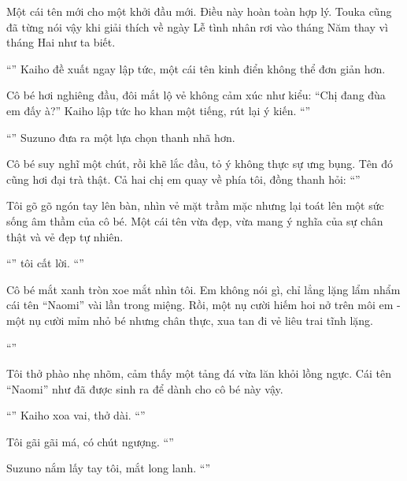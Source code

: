 \documentclass[../main.tex]{subfiles}
\begin{document}
Một cái tên mới cho một khởi đầu mới. Điều này hoàn toàn hợp lý. Touka cũng đã từng nói vậy khi giải thích về ngày Lễ tình nhân rơi vào tháng Năm thay vì tháng Hai như ta biết.

``'' Kaiho đề xuất ngay lập tức, một cái tên kinh điển không thể đơn giản hơn.

Cô bé hơi nghiêng đầu, đôi mắt lộ vẻ không cảm xúc như kiểu: ``Chị đang đùa em đấy à?'' Kaiho lập tức ho khan một tiếng, rút lại ý kiến. ``''

``'' Suzuno đưa ra một lựa chọn thanh nhã hơn.

Cô bé suy nghĩ một chút, rồi khẽ lắc đầu, tỏ ý không thực sự ưng bụng. Tên đó cũng hơi đại trà thật. Cả hai chị em quay về phía tôi, đồng thanh hỏi: ``''

Tôi gõ gõ ngón tay lên bàn, nhìn vẻ mặt trầm mặc nhưng lại toát lên một sức sống âm thầm của cô bé. Một cái tên vừa đẹp, vừa mang ý nghĩa của sự chân thật và vẻ đẹp tự nhiên.

``'' tôi cất lời. ``''

Cô bé mắt xanh tròn xoe mắt nhìn tôi. Em không nói gì, chỉ lẳng lặng lẩm nhẩm cái tên ``Naomi'' vài lần trong miệng. Rồi, một nụ cười hiếm hoi nở trên môi em - một nụ cười mỉm nhỏ bé nhưng chân thực, xua tan đi vẻ liêu trai tĩnh lặng.

``''

Tôi thở phào nhẹ nhõm, cảm thấy một tảng đá vừa lăn khỏi lồng ngực. Cái tên ``Naomi'' như đã được sinh ra để dành cho cô bé này vậy.

``'' Kaiho xoa vai, thở dài. ``''

Tôi gãi gãi má, có chút ngượng. ``''

Suzuno nắm lấy tay tôi, mắt long lanh. ``''
\end{document}
